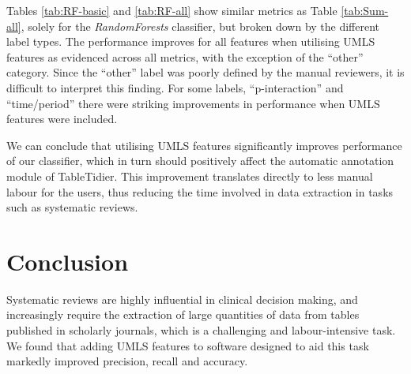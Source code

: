 \documentclass[10.7pt,]{article}
\begin{document}




%

Tables \ref{tab:RF-basic} and \ref{tab:RF-all} show similar metrics as Table \ref{tab:Sum-all}, solely for the \textit{RandomForests} classifier, but broken down by the different label types. The performance improves for all features when utilising UMLS features as evidenced across all metrics, with the exception of the ``other'' category. Since the ``other'' label was poorly defined by the manual reviewers, it is difficult to interpret this finding. For some labels, ``p-interaction'' and ``time/period'' there were striking improvements in performance when UMLS features were included.

We can conclude that utilising UMLS features significantly improves performance of our classifier, which in turn should positively affect the automatic annotation module of TableTidier. This improvement translates directly to less manual labour for the users, thus reducing the time involved in data extraction in tasks such as systematic reviews.

%

%
%

\section{Conclusion}\label{conclusion}

Systematic reviews are highly influential in clinical decision making, and increasingly require the extraction of large quantities of data from tables published in scholarly journals, which is a challenging and labour-intensive task. We found that adding UMLS features to software designed to aid this task markedly improved precision, recall and accuracy. 
\end{document}
